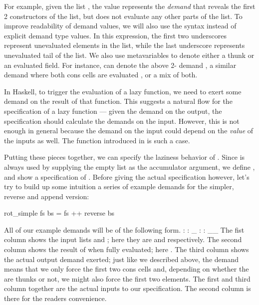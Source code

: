 \documentclass[acmsmall,review]{acmart}\settopmatter{}
\begin{document}
For example, given the list \lk{[1, 2, 3]}, the value  represents the \textit{demand} that reveals the first
2  constructors of the list, but does not evaluate any other
parts of the list. To improve readability of demand values, we will
also use the syntax \lk{\_ : \_ : \_} instead of explicit demand type
values. In this expression, the first two underscores represent
unevaluated elements in the list, while the last underscore represents
unevaluated tail of the list.
%
We also use metavariables  to denote either a thunk or an
evaluated field. For instance,  can denote the
above 2- demand \lk{\_ : \_ : \_}, a similar demand where
both cons cells are evaluated , or a mix of both.

In Haskell, to trigger the evaluation of a lazy function, we need to
exert some demand on the result of that function. This suggests a
natural flow for the specification of a lazy function --- given the
demand on the output, the specification should calculate the demands
on the input. However, this is not enough in general because the
demand on the input could depend on the \textit{value} of the inputs
as well. The  function introduced in  is such
a case.

Putting these pieces together, we can specify the laziness behavior
of . Since  is always used by supplying the
empty list \lk{[]} as the accumulator argument, we define , and show a specification of .  Before
giving the actual specification however, let's try to build up some
intuition a series of example demands for the simpler, reverse and
append version:
%
\begin{inlinecode}
  rot_simple fs bs = fs ++ reverse bs
\end{inlinecode}

All of our example demands will be of the following form.
%
\rotex{[1,2,3]}{[6,5,4]}{[1,2,3,4,5,6]}
      { :  : \_}{ :  : \_}{\_}
%
The fist column shows the input lists  and ; here they
are \lk{[1,2,3]} and \lk{[4,5,6]} respectively. The second column
shows the result of  when fully evaluated;
here \lk{[1,2,3,4,5,6]}. The third column shows the actual output
demand exerted; just like we described above, the demand  means that we only force the first two cons cells and, depending
on whether the  are thunks or not, we might also force the
first two elements. The first and third column together are the actual
inputs to our specification. The second column is there for the
readers convenience.
\end{document}
